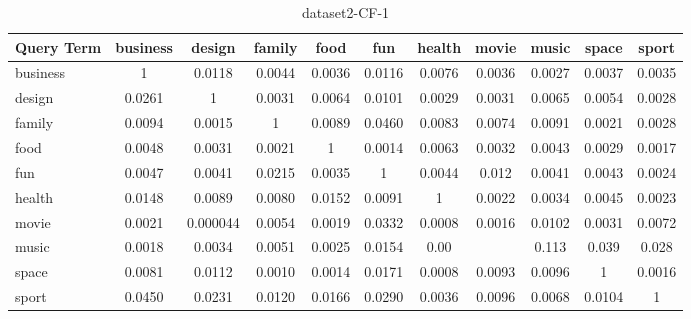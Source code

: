 \documentclass{sig-alternate}
\begin{document}
\begin{table}[!ht]
\centering
\resizebox{14cm}{!} 
{
	\begin{tabular}{|l|c|c|c|c|c|c|c|c|c|c|}
	\hline
Query Term & business & design & family & food & fun & health & movie & music & space & sport\\
	\hline
business	 & 1 & 0.0118 & 0.0044 & 0.0036 & 0.0116 & 0.0076 & 0.0036 & 0.0027 & 0.0037 & 0.0035\\ 
	 	\hline
design & 0.0261 & 1 & 0.0031 & 0.0064 & 0.0101 & 0.0029 & 0.0031 & 0.0065 & 0.0054 & 0.0028
	 	\\ 
	 	\hline
	 	
family & 0.0094  & 0.0015 & 1 & 0.0089 & 0.0460 & 0.0083 & 0.0074 & 0.0091 & 0.0021 & 0.0028 
	 	 \\ 
	 	\hline
food & 0.0048 & 0.0031 & 0.0021 & 1 & 0.0014 & 0.0063 & 0.0032 & 0.0043 & 0.0029 & 0.0017 
	 	\\ 
	 	\hline
fun & 0.0047 & 0.0041 & 0.0215 & 0.0035	& 1 & 0.0044 & 0.012 & 0.0041 & 0.0043 & 0.0024 
	 	\\ 
	 	\hline
	 health	 & 0.0148 & 0.0089 & 0.0080 & 0.0152 & 0.0091 & 1 & 0.0022 & 0.0034 & 0.0045 & 0.0023
	 	\\ 
	 	\hline
movie & 0.0021 & 0.000044 & 0.0054 & 0.0019 & 0.0332 & 0.0008 & 0.0016 & 0.0102 & 0.0031 & 0.0072 
	 	 \\ 
	 	\hline
music & 0.0018 & 0.0034 & 0.0051 & 0.0025 & 0.0154 & 0.00 & & 0.113 & 0.039 & 0.028 
	 	\\ 
	 	\hline
space & 0.0081 & 0.0112 & 0.0010 & 0.0014 & 0.0171 & 0.0008 & 0.0093 & 0.0096 & 1 & 0.0016 
	 	\\ 
	 	\hline
sport & 0.0450 & 0.0231 & 0.0120 & 0.0166 & 0.0290 & 0.0036 & 0.0096 & 0.0068 & 0.0104 & 1 \\
	\hline
	\end{tabular}
}
\caption{dataset2-CF-1}\label{cf6}
\end{table}

















\end{document}
